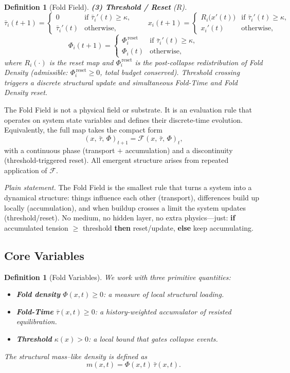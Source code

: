 \documentclass[11pt]{article}
\newtheorem{definition}[theorem]{Definition}
\begin{document}
\begin{definition}[Fold Field]
\medskip
\noindent\textbf{(3) Threshold / Reset} ($R$).
\[
\bar{\tau}_i(t+1) =
\begin{cases}
0 & \text{if } \bar{\tau}_i'(t) \ge \kappa, \\
\bar{\tau}_i'(t) & \text{otherwise,}
\end{cases}
\qquad
x_i(t+1) =
\begin{cases}
R_i\!\bigl(x'(t)\bigr) & \text{if } \bar{\tau}_i'(t) \ge \kappa, \\
x_i'(t) & \text{otherwise,}
\end{cases}
\]
\[
\Phi_i(t+1) =
\begin{cases}
\Phi_i^{\,\mathrm{reset}} & \text{if } \bar{\tau}_i'(t) \ge \kappa, \\
\Phi_i(t) & \text{otherwise,}
\end{cases}
\]
where $R_i(\cdot)$ is the reset map and $\Phi_i^{\,\mathrm{reset}}$ is the
post-collapse redistribution of Fold Density (admissible: $\Phi_i^{\,\mathrm{reset}} \geq 0$,
total budget conserved). Threshold crossing triggers a discrete structural update
and simultaneous Fold-Time and Fold Density reset.
\end{definition}

\noindent The Fold Field is not a physical field or substrate. It is an evaluation rule
that operates on system state variables and defines their discrete-time evolution.
Equivalently, the full map takes the compact form
\[
(x,\,\bar{\tau},\,\Phi)_{t+1} = \mathcal{F}(x,\,\bar{\tau},\,\Phi)_t,
\]
with a continuous phase (transport $+$ accumulation) and a discontinuity
(threshold-triggered reset). All emergent structure arises from repeated application
of $\mathcal{F}$.

\medskip
\noindent\textit{Plain statement.} The Fold Field is the smallest rule that turns a
system into a dynamical structure: things influence each other (transport), differences
build up locally (accumulation), and when buildup crosses a limit the system updates
(threshold/reset). No medium, no hidden layer, no extra physics---just:
\textbf{if} accumulated tension $\ge$ threshold \textbf{then} reset/update,
\textbf{else} keep accumulating.

\subsection{Core Variables}
\begin{definition}[Fold Variables]
We work with three primitive quantities:
\begin{itemize}[leftmargin=*]
    \item \textbf{Fold density} $\Phi(x,t) \geq 0$: a measure of local structural loading.
    \item \textbf{Fold-Time} $\bar{\tau}(x,t) \geq 0$: a history-weighted accumulator of resisted equilibration.
    \item \textbf{Threshold} $\kappa(x) > 0$: a local bound that gates collapse events.
\end{itemize}
The \emph{structural mass--like density} is defined as
\[
m(x,t) = \Phi(x,t)\,\bar{\tau}(x,t).
\]
\end{definition}
\end{document}
